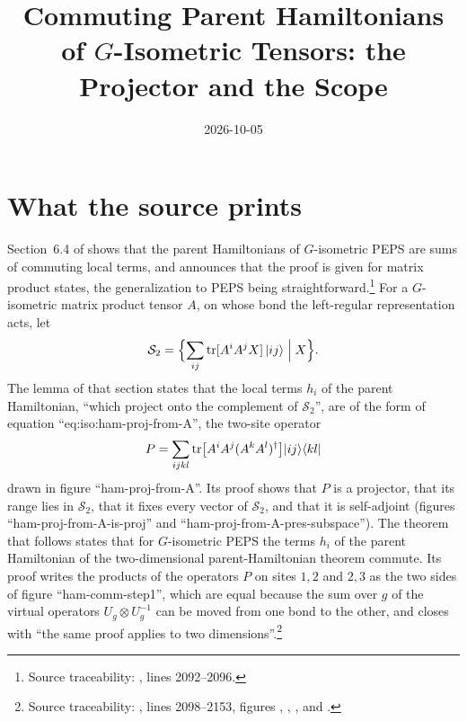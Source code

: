 \documentclass{article}
\title{Commuting Parent Hamiltonians of $G$-Isometric Tensors: the Projector and the Scope}
\author{}
\date{2026-10-05}
\begin{document}
\maketitle
{}

\section{What the source prints}
Section~6.4 of \cite{Schuch2010PEPS} shows that the parent Hamiltonians of
$G$-isometric PEPS are sums of commuting local terms, and announces that the
proof is given for matrix product states, the generalization to PEPS being
straightforward.\footnote{Source traceability:
    , lines 2092--2096.}
For a $G$-isometric matrix product tensor $A$, on whose bond the
left-regular representation acts, let
\begin{align}
    \mathcal S_2=\Bigl\{\sum_{ij}\operatorname{tr}[A^iA^jX]\,|ij\rangle
        \Bigm| X\Bigr\}.
    \label{eq:scp10_s2}
\end{align}
The lemma of that section states that the local terms $h_i$ of the parent
Hamiltonian, ``which project onto the complement of $\mathcal S_2$'', are of
the form of equation ``eq:iso:ham-proj-from-A'', the two-site operator
\begin{align}
    P=\sum_{ijkl}\operatorname{tr}\bigl[A^iA^j(A^kA^l)^\dagger\bigr]
        |ij\rangle\langle kl|
    \label{eq:scp10_projector}
\end{align}
drawn in figure ``ham-proj-from-A''. Its proof shows that $P$ is a projector,
that its range lies in $\mathcal S_2$, that it fixes every vector of
$\mathcal S_2$, and that it is self-adjoint (figures
``ham-proj-from-A-is-proj'' and ``ham-proj-from-A-pres-subspace'').
The theorem that follows states that for $G$-isometric PEPS the terms $h_i$
of the parent Hamiltonian of the two-dimensional parent-Hamiltonian theorem
commute. Its proof writes the products of the operators $P$ on sites $1,2$
and $2,3$ as the two sides of figure ``ham-comm-step1'', which are equal
because the sum over $g$ of the virtual operators $U_g\otimes U_g^{-1}$ can
be moved from one bond to the other, and closes with ``the same proof applies
to two dimensions''.\footnote{Source traceability:
    , lines 2098--2153, figures
    ,
    ,
    ,
     and
    .}
\end{document}
